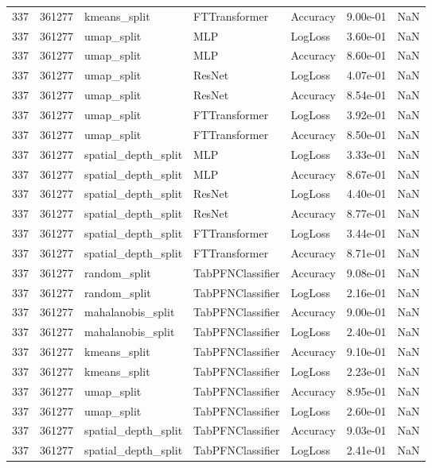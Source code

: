 \begin{tabular}{rrlllrr}
337 & 361277 & kmeans\_split & FTTransformer & Accuracy & 9.00e-01 & NaN \\
337 & 361277 & umap\_split & MLP & LogLoss & 3.60e-01 & NaN \\
337 & 361277 & umap\_split & MLP & Accuracy & 8.60e-01 & NaN \\
337 & 361277 & umap\_split & ResNet & LogLoss & 4.07e-01 & NaN \\
337 & 361277 & umap\_split & ResNet & Accuracy & 8.54e-01 & NaN \\
337 & 361277 & umap\_split & FTTransformer & LogLoss & 3.92e-01 & NaN \\
337 & 361277 & umap\_split & FTTransformer & Accuracy & 8.50e-01 & NaN \\
337 & 361277 & spatial\_depth\_split & MLP & LogLoss & 3.33e-01 & NaN \\
337 & 361277 & spatial\_depth\_split & MLP & Accuracy & 8.67e-01 & NaN \\
337 & 361277 & spatial\_depth\_split & ResNet & LogLoss & 4.40e-01 & NaN \\
337 & 361277 & spatial\_depth\_split & ResNet & Accuracy & 8.77e-01 & NaN \\
337 & 361277 & spatial\_depth\_split & FTTransformer & LogLoss & 3.44e-01 & NaN \\
337 & 361277 & spatial\_depth\_split & FTTransformer & Accuracy & 8.71e-01 & NaN \\
337 & 361277 & random\_split & TabPFNClassifier & Accuracy & 9.08e-01 & NaN \\
337 & 361277 & random\_split & TabPFNClassifier & LogLoss & 2.16e-01 & NaN \\
337 & 361277 & mahalanobis\_split & TabPFNClassifier & Accuracy & 9.00e-01 & NaN \\
337 & 361277 & mahalanobis\_split & TabPFNClassifier & LogLoss & 2.40e-01 & NaN \\
337 & 361277 & kmeans\_split & TabPFNClassifier & Accuracy & 9.10e-01 & NaN \\
337 & 361277 & kmeans\_split & TabPFNClassifier & LogLoss & 2.23e-01 & NaN \\
337 & 361277 & umap\_split & TabPFNClassifier & Accuracy & 8.95e-01 & NaN \\
337 & 361277 & umap\_split & TabPFNClassifier & LogLoss & 2.60e-01 & NaN \\
337 & 361277 & spatial\_depth\_split & TabPFNClassifier & Accuracy & 9.03e-01 & NaN \\
337 & 361277 & spatial\_depth\_split & TabPFNClassifier & LogLoss & 2.41e-01 & NaN \\

\end{tabular}

